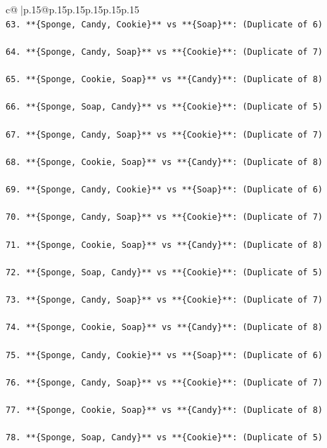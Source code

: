 \documentclass{article}
\begin{document}
{\begin{supertabular}{c@{$\;$}|p{.15\linewidth}@{}p{.15\linewidth}p{.15\linewidth}p{.15\linewidth}p{.15\linewidth}p{.15\linewidth}}
{{{\\ 
\texttt{63. **\{Sponge, Candy, Cookie\}** vs **\{Soap\}**: (Duplicate of 6)} \\
\\ 
\texttt{64. **\{Sponge, Candy, Soap\}** vs **\{Cookie\}**: (Duplicate of 7)} \\
\\ 
\texttt{65. **\{Sponge, Cookie, Soap\}** vs **\{Candy\}**: (Duplicate of 8)} \\
\\ 
\texttt{66. **\{Sponge, Soap, Candy\}** vs **\{Cookie\}**: (Duplicate of 5)} \\
\\ 
\texttt{67. **\{Sponge, Candy, Soap\}** vs **\{Cookie\}**: (Duplicate of 7)} \\
\\ 
\texttt{68. **\{Sponge, Cookie, Soap\}** vs **\{Candy\}**: (Duplicate of 8)} \\
\\ 
\texttt{69. **\{Sponge, Candy, Cookie\}** vs **\{Soap\}**: (Duplicate of 6)} \\
\\ 
\texttt{70. **\{Sponge, Candy, Soap\}** vs **\{Cookie\}**: (Duplicate of 7)} \\
\\ 
\texttt{71. **\{Sponge, Cookie, Soap\}** vs **\{Candy\}**: (Duplicate of 8)} \\
\\ 
\texttt{72. **\{Sponge, Soap, Candy\}** vs **\{Cookie\}**: (Duplicate of 5)} \\
\\ 
\texttt{73. **\{Sponge, Candy, Soap\}** vs **\{Cookie\}**: (Duplicate of 7)} \\
\\ 
\texttt{74. **\{Sponge, Cookie, Soap\}** vs **\{Candy\}**: (Duplicate of 8)} \\
\\ 
\texttt{75. **\{Sponge, Candy, Cookie\}** vs **\{Soap\}**: (Duplicate of 6)} \\
\\ 
\texttt{76. **\{Sponge, Candy, Soap\}** vs **\{Cookie\}**: (Duplicate of 7)} \\
\\ 
\texttt{77. **\{Sponge, Cookie, Soap\}** vs **\{Candy\}**: (Duplicate of 8)} \\
\\ 
\texttt{78. **\{Sponge, Soap, Candy\}** vs **\{Cookie\}**: (Duplicate of 5)} \\
}}}
\end{supertabular}}
\end{document}
